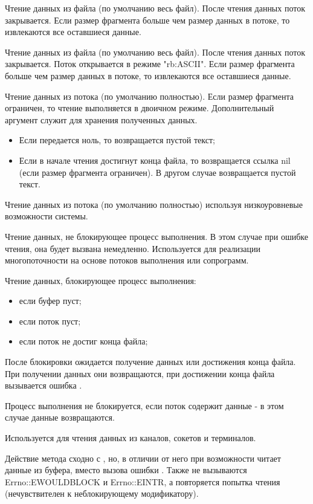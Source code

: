 \begin{methodlist}
  Чтение данных из файла (по умолчанию весь файл). После чтения данных поток закрывается. Если размер фрагмента больше чем размер данных в потоке, то извлекаются все оставшиеся данные.    

  Чтение данных из файла (по умолчанию весь файл). После чтения данных поток закрывается. Поток открывается в режиме "rb:ASCII". Если размер фрагмента больше чем размер данных в потоке, то извлекаются все оставшиеся данные.
 
  Чтение данных из потока (по умолчанию полностью). Если размер фрагмента ограничен, то чтение выполняется в двоичном режиме. Дополнительный аргумент служит для хранения полученных данных.
  \begin{itemize}
    \item Если передается ноль, то возвращается пустой текст;
    \item Если в начале чтения достигнут конца файла, то возвращается ссылка nil (если размер фрагмента ограничен). В другом случае возвращается пустой текст. 
  \end{itemize}
 
  Чтение данных из потока (по умолчанию полностью) используя низкоуровневые возможности системы.
 
  Чтение данных, не блокирующее процесс выполнения. В этом случае при ошибке чтения, она будет вызвана немедленно. Используется для реализации многопоточности на основе потоков выполнения или сопрограмм.
 
  Чтение данных, блокирующее процесс выполнения:
  \begin{itemize}
    \item если буфер пуст;
    \item если поток пуст;
    \item если поток не достиг конца файла;
  \end{itemize}
  
  После блокировки ожидается получение данных или достижения конца файла. При получении данных они возвращаются, при достижении конца файла вызывается ошибка .

  Процесс выполнения не блокируется, если поток содержит данные - в этом случае данные возвращаются.

  Используется для чтения данных из каналов, сокетов и терминалов.

  Действие метода сходно с , но, в отличии от него при возможности читает данные из буфера, вместо вызова ошибки . Также не вызываются Errno::EWOULDBLOCK и Errno::EINTR, а повторяется попытка чтения (нечувствителен к неблокирующему модификатору).
\end{methodlist}

